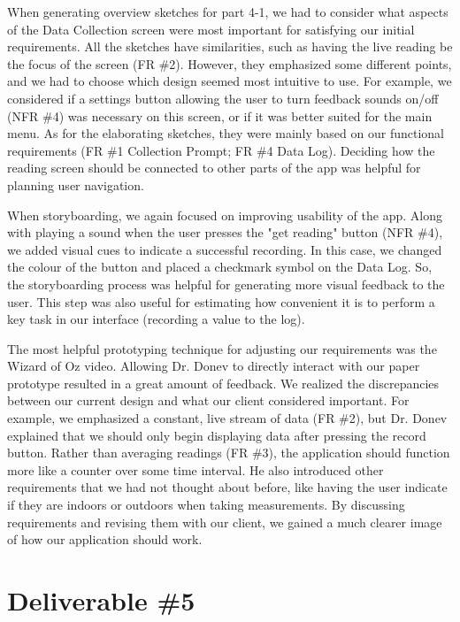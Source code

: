 \documentclass[11pt,a4paper]{article}
\begin{document}
When generating overview sketches for part 4-1, we had to consider what aspects of the Data Collection screen were most important for satisfying our initial requirements. All the sketches have similarities, such as having the live reading be the focus of the screen (FR \#2). However, they emphasized some different points, and we had to choose which design seemed most intuitive to use. For example, we considered if a settings button allowing the user to turn feedback sounds on/off (NFR \#4) was necessary on this screen, or if it was better suited for the main menu. As for the elaborating sketches, they were mainly based on our functional requirements (FR \#1 Collection Prompt; FR \#4 Data Log).  Deciding how the reading screen should be connected to other parts of the app was helpful for planning user navigation.

When storyboarding, we again focused on improving usability of the app. Along with playing a sound when the user presses the "get reading" button (NFR \#4), we added visual cues to indicate a successful recording. In this case, we changed the colour of the button and placed a checkmark symbol on the Data Log. So, the storyboarding process was helpful for generating more visual feedback to the user. This step was also useful for estimating how convenient it is to perform a key task in our interface (recording a value to the log).

The most helpful prototyping technique for adjusting our requirements was the Wizard of Oz video. Allowing Dr. Donev to directly interact with our paper prototype resulted in a great amount of feedback. We realized the discrepancies between our current design and what our client considered important. For example, we emphasized a constant, live stream of data (FR \#2), but Dr. Donev explained that we should only begin displaying data after pressing the record button. Rather than averaging readings (FR \#3), the application should function more like a counter over some time interval. He also introduced other requirements that we had not thought about before, like having the user indicate if they are indoors or outdoors when taking measurements. By discussing requirements and revising them with our client, we gained a much clearer image of how our application should work.



\newpage
\section*{Deliverable \#5}
\end{document}

